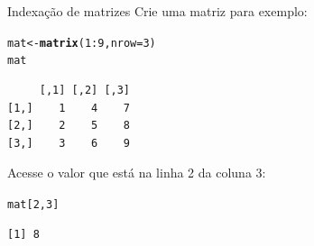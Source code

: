 \documentclass[10pt,handout]{beamer}\usepackage[]{graphicx}\usepackage[]{color}
\makeatletter
\newcommand{\hlnum}[1]{\textcolor[rgb]{0.686,0.059,0.569}{#1}}%
\newcommand{\hlopt}[1]{\textcolor[rgb]{0,0,0}{#1}}%
\newcommand{\hlstd}[1]{\textcolor[rgb]{0.345,0.345,0.345}{#1}}%
\newcommand{\hlkwb}[1]{\textcolor[rgb]{0.69,0.353,0.396}{#1}}%
\newcommand{\hlkwc}[1]{\textcolor[rgb]{0.333,0.667,0.333}{#1}}%
\newcommand{\hlkwd}[1]{\textcolor[rgb]{0.282,0.239,0.545}{\textbf{#1}}}%
\newenvironment{kframe}{%
 \def\at@end@of@kframe{}%
 \ifinner\ifhmode%
  \def\at@end@of@kframe{\end{minipage}}%
  \begin{minipage}{\columnwidth}%
 \fi\fi%
 \def\FrameCommand##1{\hskip\@totalleftmargin \hskip-\fboxsep
 \colorbox{shadecolor}{##1}\hskip-\fboxsep
     \hskip-\linewidth \hskip-\@totalleftmargin \hskip\columnwidth}%
 \MakeFramed {\advance\hsize-\width
   \@totalleftmargin\z@ \linewidth\hsize
   \@setminipage}}%
 {\par\unskip\endMakeFramed%
 \at@end@of@kframe}
\newenvironment{knitrout}{}{} %
\makeatother
\begin{document}
\begin{frame}[fragile]{Indexação de matrizes}
Crie uma matriz para exemplo:
\begin{knitrout}\small
{}\color{fgcolor}\begin{kframe}
\begin{alltt}
\hlstd{mat} \hlkwb{<-} \hlkwd{matrix}\hlstd{(}\hlnum{1}\hlopt{:}\hlnum{9}\hlstd{,} \hlkwc{nrow}\hlstd{=}\hlnum{3}\hlstd{)}
\hlstd{mat}
\end{alltt}
\begin{verbatim}
     [,1] [,2] [,3]
[1,]    1    4    7
[2,]    2    5    8
[3,]    3    6    9
\end{verbatim}
\end{kframe}
\end{knitrout}

Acesse o valor que está na linha 2 da coluna 3:
\begin{knitrout}\small
{}\color{fgcolor}\begin{kframe}
\begin{alltt}
\hlstd{mat[}\hlnum{2}\hlstd{,}\hlnum{3}\hlstd{]}
\end{alltt}
\begin{verbatim}
[1] 8
\end{verbatim}
\end{kframe}
\end{knitrout}

\end{frame}
\end{document}

